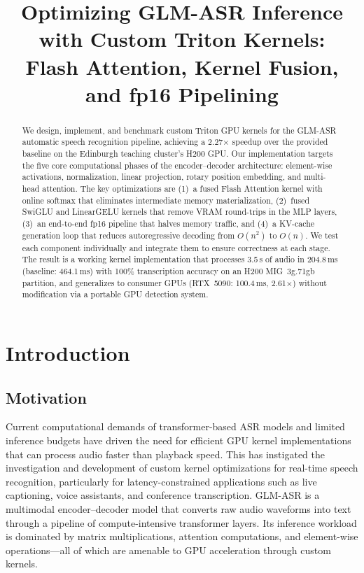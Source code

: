 \documentclass{article}
\title{Optimizing GLM-ASR Inference with Custom Triton Kernels:\\Flash Attention, Kernel Fusion, and fp16 Pipelining}
\begin{document}
\maketitle

\begin{abstract}
We design, implement, and benchmark custom Triton GPU kernels for the GLM-ASR automatic speech recognition pipeline, achieving a 2.27$\times$ speedup over the provided baseline on the Edinburgh teaching cluster's H200 GPU.
Our implementation targets the five core computational phases of the encoder--decoder architecture: element-wise activations, normalization, linear projection, rotary position embedding, and multi-head attention.
The key optimizations are (1)~a fused Flash Attention kernel with online softmax that eliminates intermediate memory materialization, (2)~fused SwiGLU and LinearGELU kernels that remove VRAM round-trips in the MLP layers, (3)~an end-to-end fp16 pipeline that halves memory traffic, and (4)~a KV-cache generation loop that reduces autoregressive decoding from $O(n^2)$ to $O(n)$.
We test each component individually and integrate them to ensure correctness at each stage.
The result is a working kernel implementation that processes 3.5\,s of audio in 204.8\,ms (baseline: 464.1\,ms) with 100\% transcription accuracy on an H200 MIG~3g.71gb partition, and generalizes to consumer GPUs (RTX~5090: 100.4\,ms, 2.61$\times$) without modification via a portable GPU detection system.
\end{abstract}

\section{Introduction}\label{sec:motivation}

\subsection{Motivation}

Current computational demands of transformer-based ASR models and limited inference budgets have driven the need for efficient GPU kernel implementations that can process audio faster than playback speed.
This has instigated the investigation and development of custom kernel optimizations for real-time speech recognition, particularly for latency-constrained applications such as live captioning, voice assistants, and conference transcription.
GLM-ASR is a multimodal encoder--decoder model that converts raw audio waveforms into text through a pipeline of compute-intensive transformer layers.
Its inference workload is dominated by matrix multiplications, attention computations, and element-wise operations---all of which are amenable to GPU acceleration through custom kernels.
\end{document}
